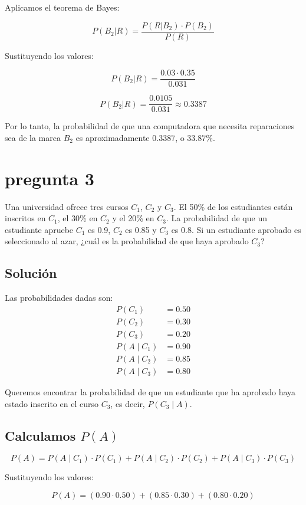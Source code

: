 \documentclass[12pt,a4paper]{article}
\begin{document}
Aplicamos el teorema de Bayes:

\[
P(B_2|R) = \frac{P(R|B_2) \cdot P(B_2)}{P(R)}
\]

Sustituyendo los valores:

\[
P(B_2|R) = \frac{0.03 \cdot 0.35}{0.031}
\]

\[
P(B_2|R) = \frac{0.0105}{0.031} \approx 0.3387
\]

Por lo tanto, la probabilidad de que una computadora que necesita reparaciones sea de la marca \( B_2 \) es aproximadamente \( 0.3387 \), o \( 33.87\% \).

\section*{pregunta 3}
Una universidad ofrece tres cursos \( C_1 \), \( C_2 \) y \( C_3 \). El 50\% de los estudiantes están inscritos en \( C_1 \), el 30\% en \( C_2 \) y el 20\% en \( C_3 \). La probabilidad de que un estudiante apruebe \( C_1 \) es 0.9, \( C_2 \) es 0.85 y \( C_3 \) es 0.8. Si un estudiante aprobado es seleccionado al azar, ¿cuál es la probabilidad de que haya aprobado \( C_3 \)?

\subsection*{Solución}

Las probabilidades dadas son:
\begin{align*}
P(C_1) &= 0.50 \\
P(C_2) &= 0.30 \\
P(C_3) &= 0.20 \\
P(A \mid C_1) &= 0.90 \\
P(A \mid C_2) &= 0.85 \\
P(A \mid C_3) &= 0.80
\end{align*}

Queremos encontrar la probabilidad de que un estudiante que ha aprobado haya estado inscrito en el curso \( C_3 \), es decir, \( P(C_3 \mid A) \).

\subsection*{Calculamos \( P(A) \)}

\[
P(A) = P(A \mid C_1) \cdot P(C_1) + P(A \mid C_2) \cdot P(C_2) + P(A \mid C_3) \cdot P(C_3)
\]

Sustituyendo los valores:

\[
P(A) = (0.90 \cdot 0.50) + (0.85 \cdot 0.30) + (0.80 \cdot 0.20)
\]
\end{document}
